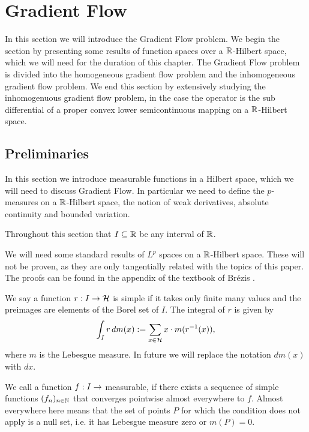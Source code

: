 \section{Gradient Flow}

In this section we will introduce the Gradient Flow problem.
We begin the section by presenting some results of
function spaces over a $ \mathbb{R} $-Hilbert space, which
we will need for the duration of this chapter.
The Gradient Flow problem is divided into 
the homogeneous gradient flow problem and the
inhomogeneous gradient flow problem. 
We end this section by extensively studying the inhomogenuous gradient
flow problem, in the case the operator is the sub differential
of a proper convex lower semicontinuous mapping on a $ \mathbb{R} $-Hilbert space.\medskip 

\subsection{Preliminaries}
In this section we introduce measurable functions in a Hilbert space, 
which we will need to discuss Gradient Flow. In particular
we need to define the $ p $-measures on a $ \mathbb{R} $-Hilbert space,
the notion of weak derivatives, absolute
continuity and bounded variation.\smallskip

Throughout this section that $ I\subseteq \mathbb{R} $ be 
any interval of $ \mathbb{R} $.\smallskip

We will need some standard results of $ L^p $ spaces
on a $ \mathbb{R} $-Hilbert space. These will not be 
proven, as they are only tangentially related with the
topics of this paper. The proofs can be found 
in the appendix of the textbook
of Brézis \cite[Appendix 1 and 2]{brezis1973ope}.

\begin{definition} 
	We say a function $ r:I\rightarrow\mathcal{H} $ is simple
	if it takes only finite many values and the preimages are 
	elements of the Borel set of $ I $. The integral of $ r $
	is given by
	\begin{align*}
		\int_I r\,dm(x)
		:=\sum_{x\in\mathcal{H}} x\cdot m(r^{-1}(x)),
	\end{align*}
	where $ m $ is the Lebesgue measure. In future we will replace
	the notation $ dm(x) $ with $ dx $.
\end{definition}

\begin{definition}
	We call a function $ f:I\rightarrow $
	measurable, if there exists a sequence
	of simple functions $ (f_n)_{n\in\mathbb{N}} $
	that converges pointwise almost everywhere
	to $ f $. Almost everywhere here means that the
	set of points $ P $ for which the condition does not
	apply is a null set, i.e. it has Lebesgue measure zero or $ m(P)=0 $.
\end{definition}


